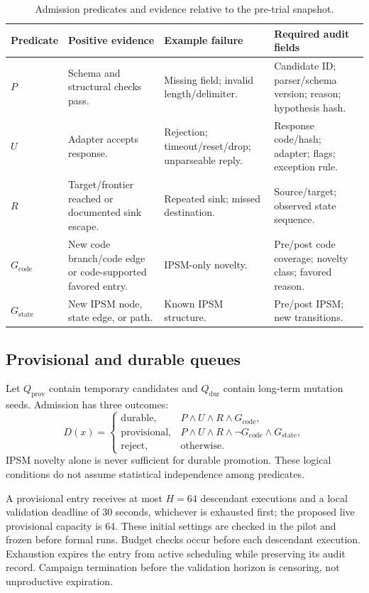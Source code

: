 \documentclass[final,5p,times,number]{elsarticle}
\newcommand{\gcode}{G_{\mathrm{code}}}
\newcommand{\gstate}{G_{\mathrm{state}}}
\begin{document}
\begin{table}[!tbp]
\centering\small
\caption{Admission predicates and evidence relative to the pre-trial snapshot.}
\label{tab:predicates}
\begin{tabularx}{\textwidth}{l Y Y Y}
\toprule
Predicate & Positive evidence & Example failure & Required audit fields \\
\midrule
$P$ & Schema and structural checks pass. & Missing field; invalid length/delimiter. & Candidate ID; parser/schema version; reason; hypothesis hash. \\
$U$ & Adapter accepts response. & Rejection; timeout/reset/drop; unparseable reply. & Response code/hash; adapter; flags; exception rule. \\
$R$ & Target/frontier reached or documented sink escape. & Repeated sink; missed destination. & Source/target; observed state sequence. \\
$\gcode$ & New code branch/code edge or code-supported favored entry. & IPSM-only novelty. & Pre/post code coverage; novelty class; favored reason. \\
$\gstate$ & New IPSM node, state edge, or path. & Known IPSM structure. & Pre/post IPSM; new transitions. \\
\bottomrule
\end{tabularx}
\end{table}

\subsection{Provisional and durable queues}
Let $Q_{\mathrm{prov}}$ contain temporary candidates and $Q_{\mathrm{dur}}$ contain long-term mutation seeds. Admission has three outcomes:
\begin{equation}
D(x)=
\begin{cases}
\mathrm{durable}, & P\land U\land R\land\gcode,\\
\mathrm{provisional}, & P\land U\land R\land\neg\gcode\land\gstate,\\
\mathrm{reject}, & \text{otherwise}.
\end{cases}\label{eq:admission}
\end{equation}
IPSM novelty alone is never sufficient for durable promotion. These logical conditions do not assume statistical independence among predicates.

A provisional entry receives at most $H=64$ descendant executions and a local validation deadline of 30 seconds, whichever is exhausted first; the proposed live provisional capacity is 64. These initial settings are checked in the pilot and frozen before formal runs. Budget checks occur before each descendant execution. Exhaustion expires the entry from active scheduling while preserving its audit record. Campaign termination before the validation horizon is censoring, not unproductive expiration.
\end{document}
